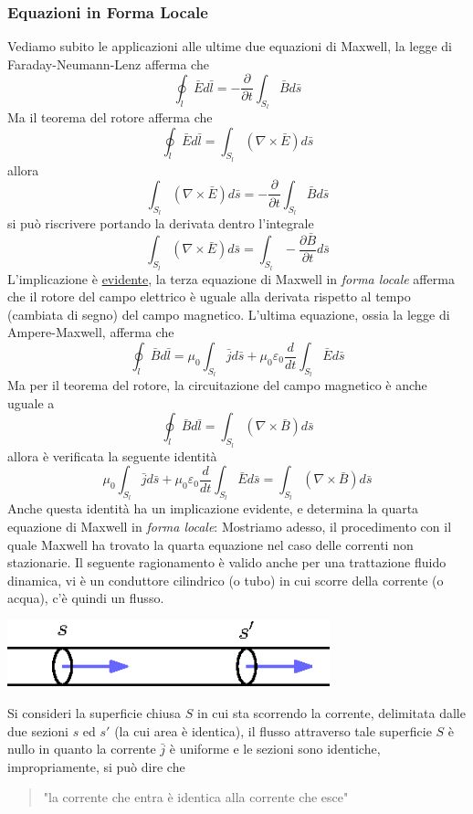 \documentclass[10pt, letterpaper]{report}
\begin{document}
\subsubsection{Equazioni in Forma Locale}
Vediamo subito le applicazioni alle ultime due equazioni di Maxwell, la legge di Faraday-Neumann-Lenz afferma che 
$$ \oint_l \bar E d\bar l = -\frac{\partial}{\partial t}\int_{S_l}\bar B d\bar s$$
Ma il teorema del rotore afferma che 
$$ \oint_l \bar E d\bar l = \int_{S_l}(\nabla \times \bar E)d\bar s$$
allora 
$$\int_{S_l}(\nabla \times \bar E)d\bar s=-\frac{\partial}{ \partial t}\int_{S_l}\bar B d\bar s$$
si può riscrivere portando la derivata dentro l'integrale 
$$\int_{S_l}(\nabla \times \bar E)d\bar s=\int_{S_l}-\frac{\partial\bar B }{\partial t}d\bar s$$
L'implicazione è \underline{evidente}, la terza equazione di Maxwell in \textit{forma locale} afferma che il rotore del campo elettrico è uguale alla derivata rispetto al tempo (cambiata di segno) del campo magnetico.
L'ultima equazione, ossia la legge di Ampere-Maxwell, afferma che 
$$\oint_l \bar B d\bar l = \mu_0\int_{S_l}\bar j d\bar s+\mu_0\varepsilon_0\frac{d}{dt}\int_{S_l}\bar E d\bar s
$$
Ma per il teorema del rotore, la circuitazione del campo magnetico è anche uguale a
$$\oint_l \bar B d\bar l = \int_{S_l}(\nabla \times \bar B)d\bar s$$
allora è verificata la seguente identità 
$$ \mu_0\int_{S_l}\bar j d\bar s+\mu_0\varepsilon_0\frac{d}{dt}\int_{S_l}\bar E d\bar s=\int_{S_l}(\nabla \times \bar B)d\bar s$$
Anche questa identità ha un implicazione evidente, e determina la quarta equazione di Maxwell in \textit{forma locale}: 
Mostriamo adesso, il procedimento con il quale Maxwell ha trovato la quarta equazione nel caso delle correnti non stazionarie. Il seguente ragionamento è valido anche per una trattazione fluido dinamica, vi è un conduttore cilindrico (o tubo) in cui scorre della corrente (o acqua), c'è quindi un flusso.\begin{center}
    \includegraphics[width=0.7\textwidth]{images/4eqMax.eps}
\end{center}
Si consideri la superficie chiusa $S$ in cui sta scorrendo la corrente, delimitata dalle due sezioni $s$ ed $s'$ (la cui area è identica), il flusso attraverso tale superficie $S$ è nullo in quanto la corrente $\bar j$ è uniforme e le sezioni sono identiche, impropriamente, si può dire che \begin{quote}
    "la corrente che entra è identica alla corrente che esce"
\end{quote}
\end{document}
